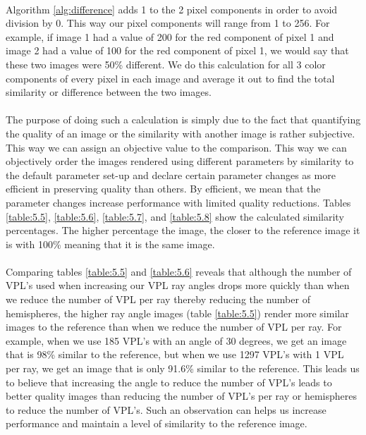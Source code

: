\paragraph{}
Algorithm \ref{alg:difference} adds 1 to the 2 pixel components in order to avoid division by 0.  This way our pixel components will range from 1 to 256.  For example, if image 1 had a value of 200 for the red component of pixel 1 and image 2 had a value of 100 for the red component of pixel 1, we would say that these two images were 50\% different.  We do this calculation for all 3 color components of every pixel in each image and average it out to find the total similarity or difference between the two images.

\paragraph{}
The purpose of doing such a calculation is simply due to the fact that quantifying the quality of an image or  the similarity with another image is rather subjective.  This way we can assign an objective value to the comparison.  This way we can objectively order the images rendered using different parameters by similarity to the default parameter set-up and declare certain parameter changes as more efficient in preserving quality than others.  By efficient, we mean that the parameter changes increase performance with limited quality reductions.  Tables \ref{table:5.5}, \ref{table:5.6}, \ref{table:5.7}, and \ref{table:5.8} show the calculated similarity percentages.  The higher percentage the image, the closer to the reference image it is with 100\% meaning that it is the same image.

\paragraph{}
Comparing tables \ref{table:5.5} and \ref{table:5.6} reveals that although the number of VPL's used when increasing our VPL ray angles drops more quickly than when we reduce the number of VPL per ray thereby reducing the number of hemispheres, the higher ray angle images (table \ref{table:5.5}) render more similar images to the reference than when we reduce the number of VPL per ray.  For example, when we use 185 VPL's with an angle of 30 degrees, we get an image that is 98\% similar to the reference, but when we use 1297 VPL's with 1 VPL per ray, we get an image that is only 91.6\% similar to the reference.  This leads us to believe that increasing the angle to reduce the number of VPL's leads to better quality images than reducing the number of VPL's per ray or hemispheres to reduce the number of VPL's.  Such an observation can helps us increase performance and maintain a level of similarity to the reference image.

